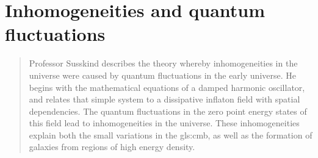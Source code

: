 \documentclass[]{article}
\begin{document}
\section{Inhomogeneities and quantum fluctuations}

\begin{quotation}
Professor Susskind describes the theory whereby inhomogeneities in the universe were caused by quantum fluctuations in the early universe.  He begins with the mathematical equations of a damped harmonic oscillator, and relates that simple system to a dissipative inflaton field with spatial dependencies.  The quantum fluctuations in the zero point energy states of this field lead to inhomogeneities in the universe.  These inhomogeneities explain both the small variations in the \gls{gls:cmb}, as well as the formation of galaxies from regions of high energy density.
\end{quotation}


\printglossaries


\raggedright

\end{document}
